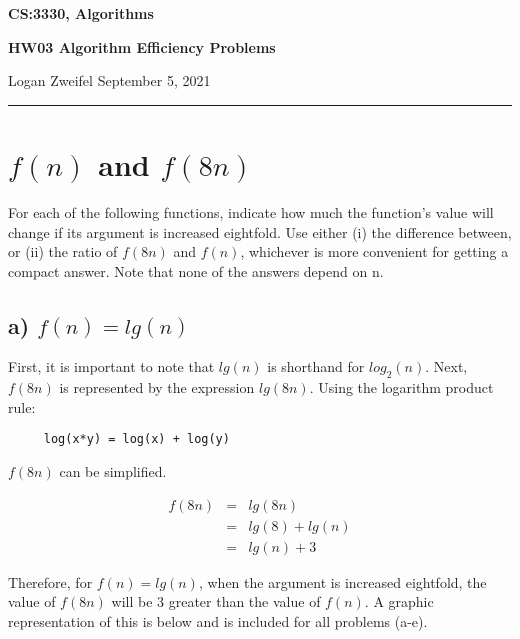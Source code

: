 \documentclass[11pt]{article}
\begin{document}
\thispagestyle{empty}

\begin{center}
\bf\large CS:3330, Algorithms
\end{center}

\begin{center}
\bf\large HW03 Algorithm Efficiency Problems    %
\end{center}

\noindent
Logan Zweifel     %
\hfill
September 5, 2021           %

\noindent
\rule{\textwidth}{1pt}

\medskip


\section{$f(n)$ and $f(8n)$}
For each of the following functions, indicate how much the function's value will change if its argument is increased eightfold. Use either (i) the difference between,
 or (ii) the ratio of $f(8n)$ and $f(n)$, whichever is more convenient for getting a compact answer. Note that none of the answers depend on n.

\subsection*{a) $f(n) = lg (n)$}
First, it is important to note that $lg (n)$ is shorthand for $log_2 (n)$. Next, $f(8n)$ is represented by the expression $lg (8n)$.
Using the logarithm product rule:

\begin{verbatim}
     log(x*y) = log(x) + log(y)
\end{verbatim}

\noindent $f(8n)$ can be simplified.

\begin{eqnarray*}
f(8n) &=& lg(8n) \\
&=& lg(8) + lg(n)\\
&=& lg(n) + 3
\end{eqnarray*}

Therefore, for $f(n) = lg(n)$, when the argument is increased eightfold, the value of $f(8n)$ will be 3 greater than the value of $f(n)$. A graphic representation of this is below and is included for all problems (a-e).
\end{document}
